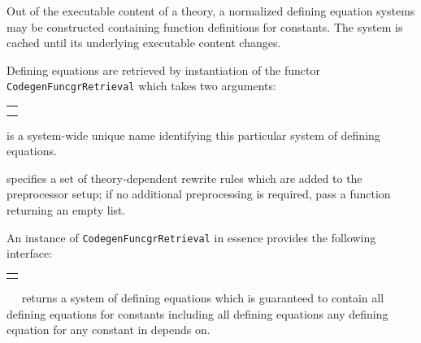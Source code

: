 \begin{isabellebody}
\begin{isamarkuptext}
\begin{description}
  \end{description}%
\end{isamarkuptext}%
\isamarkuptrue%
%
\isamarkuptrue%
%
\begin{isamarkuptext}%
Out of the executable content of a theory, a normalized
  defining equation systems may be constructed containing
  function definitions for constants.  The system is cached
  until its underlying executable content changes.

  Defining equations are retrieved by instantiation
  of the functor \verb|CodegenFuncgrRetrieval|
  which takes two arguments:

  \medskip
  \begin{tabular}{l}
  \isa{val\ name{\isacharcolon}\ string} \\
  \isa{val\ rewrites{\isacharcolon}\ theory\ {\isasymrightarrow}\ thm\ list}
  \end{tabular}

  \begin{description}

  \item {} is a system-wide unique name identifying
    this particular system of defining equations.

  \item {} specifies a set of theory-dependent
    rewrite rules which are added to the preprocessor setup;
    if no additional preprocessing is required, pass
    a function returning an empty list.

  \end{description}

  An instance of \verb|CodegenFuncgrRetrieval| in essence
  provides the following interface:

  \medskip
  \begin{tabular}{l}
  \isa{make{\isacharcolon}\ theory\ {\isasymrightarrow}\ CodegenConsts{\isachardot}const\ list\ {\isasymrightarrow}\ CodegenFuncgr{\isachardot}T} \\
  \end{tabular}

  \begin{description}

  \item {}~~ returns
    a system of defining equations which is guaranteed
    to contain all defining equations for constants 
    including all defining equations any defining equation
    for any constant in  depends on.


\end{description}
\end{isamarkuptext}
\end{isabellebody}
